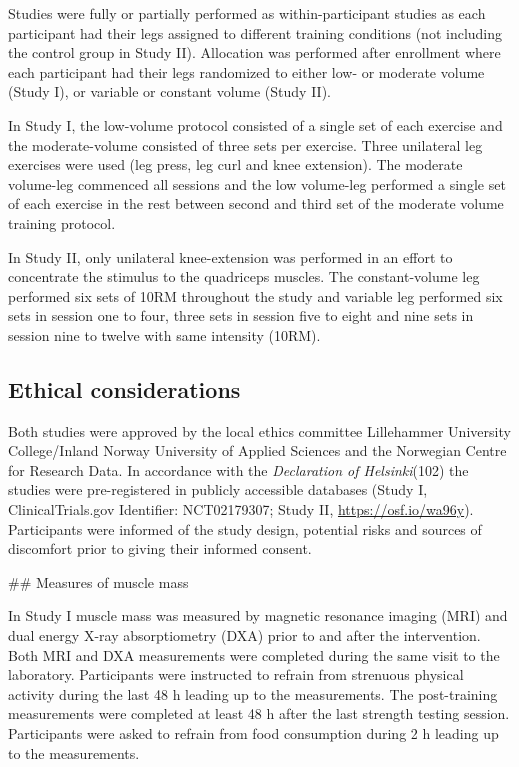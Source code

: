 \documentclass[twoside,10pt]{gihclass} %
\begin{document}
Studies were fully or partially performed as within-participant studies
as each participant had their legs assigned to different training
conditions (not including the control group in Study II). Allocation was
performed after enrollment where each participant had their legs
randomized to either low- or moderate volume (Study I), or variable or
constant volume (Study II).

In Study I, the low-volume protocol consisted of a single set of each
exercise and the moderate-volume consisted of three sets per exercise.
Three unilateral leg exercises were used (leg press, leg curl and knee
extension). The moderate volume-leg commenced all sessions and the low
volume-leg performed a single set of each exercise in the rest between
second and third set of the moderate volume training protocol.

In Study II, only unilateral knee-extension was performed in an effort
to concentrate the stimulus to the quadriceps
muscles. The constant-volume leg performed six sets
of 10RM throughout the study and variable leg performed six sets in
session one to four, three sets in session five to eight and nine sets
in session nine to twelve with same intensity (10RM).

\hypertarget{ethical-considerations}{%
\subsection{Ethical considerations}\label{ethical-considerations}}

Both studies were approved by the local ethics committee Lillehammer
University College/Inland Norway University of Applied Sciences and the
Norwegian Centre for Research Data. In accordance with the \emph{Declaration
of Helsinki}(102) the studies were pre-registered in publicly
accessible databases (Study I, ClinicalTrials.gov Identifier:
NCT02179307; Study II, \url{https://osf.io/wa96y}). Participants were
informed of the study design, potential risks and sources of discomfort
prior to giving their informed consent.

\#\# Measures of muscle mass

In Study I muscle mass was measured by magnetic resonance imaging (MRI)
and dual energy X-ray absorptiometry (DXA) prior to and after the
intervention. Both MRI and DXA measurements were completed during the
same visit to the laboratory. Participants were instructed to refrain
from strenuous physical activity during the last 48 h leading up to the
measurements. The post-training measurements were completed at least 48
h after the last strength testing session. Participants were asked to
refrain from food consumption during 2 h leading up to the measurements.
\end{document}
